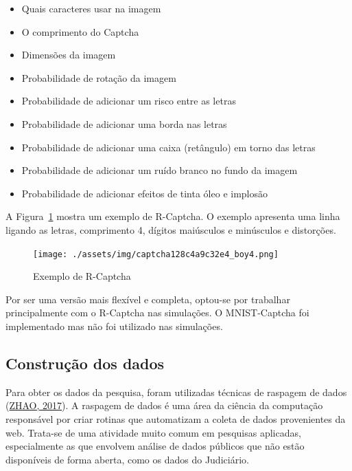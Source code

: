 \documentclass[12pt,twoside,brazilian]{book}
\providecommand{\tightlist}{%
  \setlength{\itemsep}{0pt}\setlength{\parskip}{0pt}}
\begin{document}
\begin{itemize}
\tightlist
\item
  Quais caracteres usar na imagem
\item
  O comprimento do Captcha
\item
  Dimensões da imagem
\item
  Probabilidade de rotação da imagem
\item
  Probabilidade de adicionar um risco entre as letras
\item
  Probabilidade de adicionar uma borda nas letras
\item
  Probabilidade de adicionar uma caixa (retângulo) em torno das letras
\item
  Probabilidade de adicionar um ruído branco no fundo da imagem
\item
  Probabilidade de adicionar efeitos de tinta óleo e implosão
\end{itemize}

A Figura~\ref{fig-captcha-r} mostra um exemplo de R-Captcha. O exemplo
apresenta uma linha ligando as letras, comprimento 4, dígitos maiúsculos
e minúsculos e distorções.

\begin{figure}

{\centering \texttt{[image: ./assets/img/captcha128c4a9c32e4\_boy4.png]}

}

\caption{\label{fig-captcha-r}Exemplo de R-Captcha}

\end{figure}

Por ser uma versão mais flexível e completa, optou-se por trabalhar
principalmente com o R-Captcha nas simulações. O MNIST-Captcha foi
implementado mas não foi utilizado nas simulações.

\hypertarget{sec-construcao-dados}{%
\subsection{Construção dos dados}\label{sec-construcao-dados}}

Para obter os dados da pesquisa, foram utilizadas técnicas de raspagem
de dados (\protect\hyperlink{ref-zhao2017}{ZHAO, 2017}). A raspagem de
dados é uma área da ciência da computação responsável por criar rotinas
que automatizam a coleta de dados provenientes da web. Trata-se de uma
atividade muito comum em pesquisas aplicadas, especialmente as que
envolvem análise de dados públicos que não estão disponíveis de forma
aberta, como os dados do Judiciário.
\end{document}
